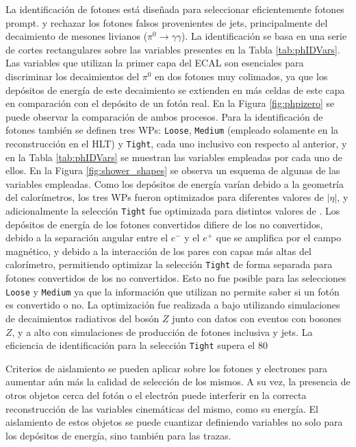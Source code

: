 La identificación de fotones está diseñada para seleccionar eficientemente fotones prompt. y rechazar los fotones falsos provenientes de jets, principalmente del decaimiento de mesones livianos ($\pi^{0}\to\gamma\gamma$). La identificación se basa en una serie de cortes rectangulares sobre las variables presentes en la Tabla \ref{tab:phIDVars}. Las variables que utilizan la primer capa del ECAL son esenciales para discriminar los decaimientos del $\pi^{0}$ en dos fotones muy colimados, ya que los depósitos de energía de este decaimiento se extienden en más celdas de este capa en comparación con el depósito de un fotón real. En la Figura \ref{fig:phpizero} se puede observar la comparación de ambos procesos. 
Para la identificación de fotones también se definen tres WPs: \texttt{Loose}, \texttt{Medium} (empleado solamente en la reconstrucción en el HLT) y \texttt{Tight}, cada uno inclusivo con respecto al anterior, y en la Tabla \ref{tab:phIDVars} se muestran las variables empleadas por cada uno de ellos. En la Figura \ref{fig:shower_shapes} se observa un esquema de algunas de las variables empleadas.
Como los depósitos de energía varían debido a la geometría del calorímetros, los tres WPs fueron optimizados para diferentes valores de $|\eta|$, y adicionalmente la selección \texttt{Tight} fue optimizada para distintos valores de \ET. Los depósitos de energía de los fotones convertidos difiere de los no convertidos, debido a la separación angular entre el $e^-$ y el $e^+$ que se amplifica por el campo magnético, y debido a la interacción de los pares con capas más altas del calorímetro, permitiendo optimizar la selección \texttt{Tight} de forma separada para fotones convertidos de los no convertidos. Esto no fue posible para las selecciones \texttt{Loose} y \texttt{Medium} ya que la información que utilizan no permite saber si un fotón es convertido o no. La optimización fue realizada a bajo \ET utilizando simulaciones de decaimientos radiativos del bosón $Z$ junto con datos con eventos con bosones $Z$, y a alto \ET con simulaciones de producción de fotones inclusiva y jets. La eficiencia de identificación para la selección \texttt{Tight} supera el 80






Criterios de aislamiento se pueden aplicar sobre los fotones y electrones para aumentar aún más la calidad de selección de los mismos. A su vez, la presencia de otros objetos cerca del fotón o el electrón puede interferir en la correcta reconstrucción de las variables cinemáticas del mismo, como su energía. El aislamiento de estos objetos se puede cuantizar definiendo variables no solo para los depósitos de energía, sino también para las trazas.

